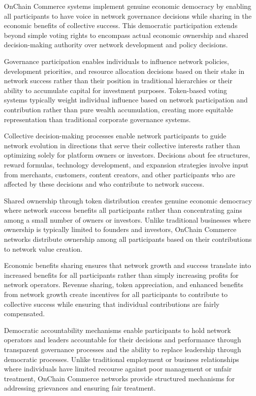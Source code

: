 \documentclass[
  Letterpaper,
]{scrbook}
\begin{document}
OnChain Commerce systems implement genuine economic democracy by
enabling all participants to have voice in network governance decisions
while sharing in the economic benefits of collective success. This
democratic participation extends beyond simple voting rights to
encompass actual economic ownership and shared decision-making authority
over network development and policy decisions.

Governance participation enables individuals to influence network
policies, development priorities, and resource allocation decisions
based on their stake in network success rather than their position in
traditional hierarchies or their ability to accumulate capital for
investment purposes. Token-based voting systems typically weight
individual influence based on network participation and contribution
rather than pure wealth accumulation, creating more equitable
representation than traditional corporate governance systems.

Collective decision-making processes enable network participants to
guide network evolution in directions that serve their collective
interests rather than optimizing solely for platform owners or
investors. Decisions about fee structures, reward formulas, technology
development, and expansion strategies involve input from merchants,
customers, content creators, and other participants who are affected by
these decisions and who contribute to network success.

Shared ownership through token distribution creates genuine economic
democracy where network success benefits all participants rather than
concentrating gains among a small number of owners or investors. Unlike
traditional businesses where ownership is typically limited to founders
and investors, OnChain Commerce networks distribute ownership among all
participants based on their contributions to network value creation.

Economic benefits sharing ensures that network growth and success
translate into increased benefits for all participants rather than
simply increasing profits for network operators. Revenue sharing, token
appreciation, and enhanced benefits from network growth create
incentives for all participants to contribute to collective success
while ensuring that individual contributions are fairly compensated.

Democratic accountability mechanisms enable participants to hold network
operators and leaders accountable for their decisions and performance
through transparent governance processes and the ability to replace
leadership through democratic processes. Unlike traditional employment
or business relationships where individuals have limited recourse
against poor management or unfair treatment, OnChain Commerce networks
provide structured mechanisms for addressing grievances and ensuring
fair treatment.
\end{document}
